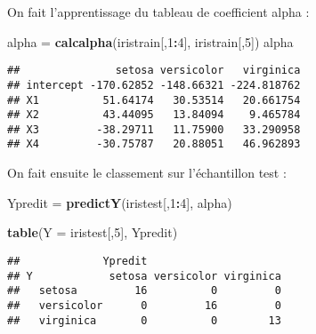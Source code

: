 \documentclass[
]{article}
\newenvironment{Shaded}{\begin{snugshade}}{\end{snugshade}}
\newcommand{\ControlFlowTok}[1]{\textcolor[rgb]{0.13,0.29,0.53}{\textbf{#1}}}
\newcommand{\DataTypeTok}[1]{\textcolor[rgb]{0.13,0.29,0.53}{#1}}
\newcommand{\DecValTok}[1]{\textcolor[rgb]{0.00,0.00,0.81}{#1}}
\newcommand{\KeywordTok}[1]{\textcolor[rgb]{0.13,0.29,0.53}{\textbf{#1}}}
\newcommand{\NormalTok}[1]{#1}
\newcommand{\OperatorTok}[1]{\textcolor[rgb]{0.81,0.36,0.00}{\textbf{#1}}}
\newcommand{\StringTok}[1]{\textcolor[rgb]{0.31,0.60,0.02}{#1}}
\begin{document}
\begin{Shaded}
\end{Shaded}

On fait l'apprentissage du tableau de coefficient alpha :

\begin{Shaded}
\begin{Highlighting}[]
\NormalTok{alpha =}\StringTok{ }\KeywordTok{calcalpha}\NormalTok{(iristrain[,}\DecValTok{1}\OperatorTok{:}\DecValTok{4}\NormalTok{], iristrain[,}\DecValTok{5}\NormalTok{])}
\NormalTok{alpha}
\end{Highlighting}
\end{Shaded}

\begin{verbatim}
##               setosa versicolor   virginica
## intercept -170.62852 -148.66321 -224.818762
## X1          51.64174   30.53514   20.661754
## X2          43.44095   13.84094    9.465784
## X3         -38.29711   11.75900   33.290958
## X4         -30.75787   20.88051   46.962893
\end{verbatim}

On fait ensuite le classement sur l'échantillon test :

\begin{Shaded}
\begin{Highlighting}[]
\NormalTok{Ypredit =}\StringTok{ }\KeywordTok{predictY}\NormalTok{(iristest[,}\DecValTok{1}\OperatorTok{:}\DecValTok{4}\NormalTok{], alpha)}
\end{Highlighting}
\end{Shaded}

\begin{Shaded}
\begin{Highlighting}[]
\KeywordTok{table}\NormalTok{(}\DataTypeTok{Y =}\NormalTok{ iristest[,}\DecValTok{5}\NormalTok{], Ypredit)}
\end{Highlighting}
\end{Shaded}

\begin{verbatim}
##             Ypredit
## Y            setosa versicolor virginica
##   setosa         16          0         0
##   versicolor      0         16         0
##   virginica       0          0        13
\end{verbatim}
\end{document}

